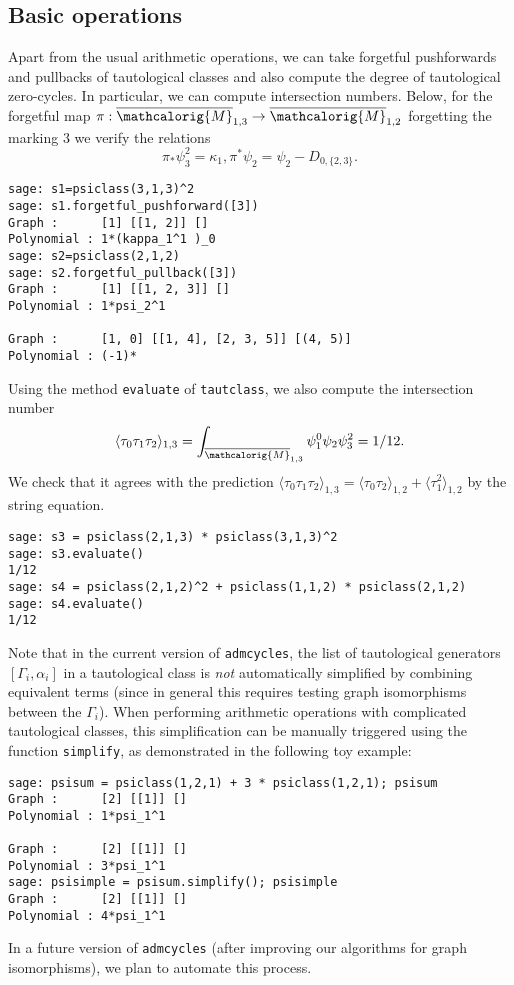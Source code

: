 \documentclass[11pt]{article}
\newcommand{\M}{\ensuremath{\overline{\mathcalorig{M}}}}
\begin{document}
\subsection{Basic operations} \label{Sect:Basicop}
Apart from the usual arithmetic operations, we can take forgetful pushforwards and pullbacks of tautological classes and also compute the degree of tautological zero-cycles. In particular, we can compute intersection numbers. Below, for the forgetful map $\pi: \M_{1,3} \to \M_{1,2}$ forgetting the marking $3$ we verify the relations
\[\pi_* \psi_3^2 = \kappa_1, \pi^* \psi_2 = \psi_2 - D_{0,\{2,3\}}.\]
\begin{lstlisting}
sage: s1=psiclass(3,1,3)^2
sage: s1.forgetful_pushforward([3])
Graph :      [1] [[1, 2]] []
Polynomial : 1*(kappa_1^1 )_0
sage: s2=psiclass(2,1,2)
sage: s2.forgetful_pullback([3])
Graph :      [1] [[1, 2, 3]] []
Polynomial : 1*psi_2^1

Graph :      [1, 0] [[1, 4], [2, 3, 5]] [(4, 5)]
Polynomial : (-1)*
\end{lstlisting}
Using the method \texttt{evaluate} of \texttt{tautclass}, we also compute the intersection number
\[\langle \tau_0 \tau_1 \tau_2 \rangle_{1,3} = \int_{\M_{1,3}} \psi_1^0 \psi_2 \psi_3^2 = 1/12.\]
We check that it agrees with the prediction $\langle \tau_0 \tau_1 \tau_2 \rangle_{1,3} = \langle \tau_0 \tau_2 \rangle_{1,2} +\langle \tau_1 ^2 \rangle_{1,2}$ by the string equation.
\begin{lstlisting}
sage: s3 = psiclass(2,1,3) * psiclass(3,1,3)^2
sage: s3.evaluate()
1/12
sage: s4 = psiclass(2,1,2)^2 + psiclass(1,1,2) * psiclass(2,1,2)
sage: s4.evaluate()
1/12
\end{lstlisting}
Note that in the current version of \texttt{admcycles}, the list of tautological generators $[\Gamma_i,\alpha_i]$ in a tautological class is \emph{not} automatically simplified by combining equivalent terms (since in general this requires testing graph isomorphisms between the $\Gamma_i$). When performing arithmetic operations with complicated tautological classes, this simplification can be manually triggered using the function \texttt{simplify}, as demonstrated in the following toy example:
\begin{lstlisting}
sage: psisum = psiclass(1,2,1) + 3 * psiclass(1,2,1); psisum
Graph :      [2] [[1]] []
Polynomial : 1*psi_1^1

Graph :      [2] [[1]] []
Polynomial : 3*psi_1^1
sage: psisimple = psisum.simplify(); psisimple
Graph :      [2] [[1]] []
Polynomial : 4*psi_1^1
\end{lstlisting}
In a future version of \texttt{admcycles} (after improving our algorithms for graph isomorphisms), we plan to automate this process.
\end{document}
